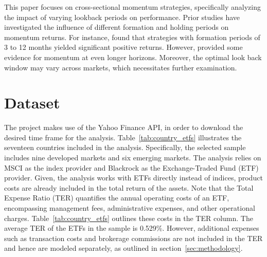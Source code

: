 \documentclass[a4paper,12pt,twoside]{article}
\begin{document}
This paper focuses on cross-sectional momentum strategies, specifically analyzing the impact of varying lookback periods on performance. Prior studies have investigated the influence of different formation and holding periods on momentum returns. For instance, \cite{jegadeesh1993returns} found that strategies with formation periods of 3 to 12 months yielded significant positive returns. However, \cite{nagel2001overreaction} provided some evidence for momentum at even longer horizons. Moreover, the optimal look back window may vary across markets, which necessitates further examination.
\newpage
\section{Dataset}
The project makes use of the Yahoo Finance API, in order to download the desired time frame for the analysis. Table~\ref{tab:country_etfs} illustrates the seventeen countries included in the analysis. Specifically, the selected sample includes nine developed markets and six emerging markets.
The analysis relies on MSCI as the index provider and Blackrock as the Exchange-Traded Fund (ETF) provider. Given, the analysis works with ETFs directly instead of indices, product costs are already included in the total return of the assets. Note that the Total Expense Ratio (TER) quantifies the annual operating costs of an ETF, encompassing management fees, administrative expenses, and other operational charges. Table~\ref{tab:country_etfs} outlines these costs in the TER column. The average TER of the ETFs in the sample is 0.529\%.
However, additional expenses such as transaction costs and brokerage commissions are not included in the TER and hence are modeled separately, as outlined in section~\ref{sec:methodology}.
\end{document}
